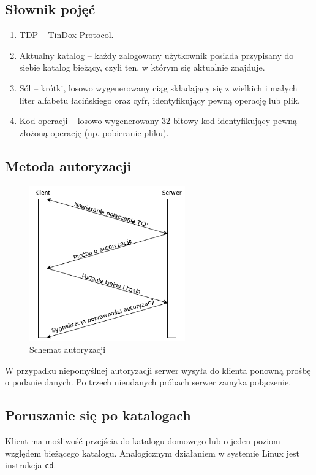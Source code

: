 \documentclass[10pt,a4paper]{article}
\begin{document}
\subsection{Słownik pojęć}
\begin{enumerate}
    \item TDP -- TinDox Protocol.
    \item Aktualny katalog -- każdy zalogowany użytkownik posiada przypisany do siebie katalog bieżący, czyli ten, w którym się aktualnie znajduje.
    \item Sól -- krótki, losowo wygenerowany ciąg składający się z wielkich i małych liter alfabetu łacińskiego oraz cyfr, identyfikujący pewną operację lub plik.
    \item Kod operacji -- losowo wygenerowany 32-bitowy kod identyfikujący pewną złożoną operację (np. pobieranie pliku).
\end{enumerate}

\pagebreak
\subsection{Metoda autoryzacji}
\begin{figure}[ht]
\centering
\includegraphics[width=0.6\textwidth]{./img/auth.png}
\caption{\label{fig:auth.png}Schemat autoryzacji}
\end{figure}
\FloatBarrier
W przypadku niepomyślnej autoryzacji serwer wysyła do klienta ponowną prośbę o podanie danych. Po trzech nieudanych próbach serwer zamyka połączenie.

\subsection{Poruszanie się po katalogach}
Klient ma możliwość przejścia do katalogu domowego lub o jeden poziom względem bieżącego katalogu. Analogicznym działaniem w systemie Linux jest instrukcja \texttt{cd}.
\end{document}
